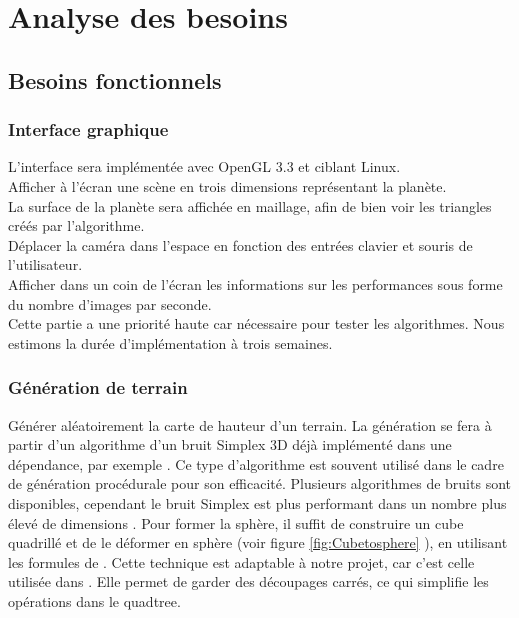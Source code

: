 \documentclass[12pt]{report}
\begin{document}
\newpage

\chapter*{Analyse des besoins}
\setcounter{chapter}{3}


\section{Besoins fonctionnels}

\subsection{Interface graphique}

L'interface sera implémentée avec OpenGL 3.3 et ciblant Linux.\\
Afficher à l'écran une scène en trois dimensions représentant la planète.\\
La surface de la planète sera affichée en maillage, afin de bien voir
les triangles créés par l'algorithme.\\
Déplacer la caméra dans l'espace en fonction des entrées clavier et
souris de l'utilisateur.\\
Afficher dans un coin de l'écran les informations sur les performances
sous forme du nombre d'images par seconde.\\

Cette partie a une priorité haute car nécessaire pour tester les
algorithmes. Nous estimons la durée d'implémentation à trois semaines.\\


\subsection{Génération de terrain}


Générer aléatoirement la carte de hauteur d'un terrain.  La génération
se fera à partir d'un algorithme d'un bruit Simplex 3D déjà implémenté
dans une dépendance, par exemple \cite{libnoise}. Ce type d'algorithme
est souvent utilisé dans le cadre de génération procédurale pour son
efficacité. Plusieurs algorithmes de bruits sont disponibles, cependant
le bruit Simplex est plus performant dans un nombre plus élevé de
dimensions \cite{Simplexnoise}.  Pour former la sphère, il suffit de
construire un cube quadrillé et de le déformer en sphère (voir figure
\ref{fig:Cubetosphere} ), en utilisant les formules de
\cite{Cube2Sphere}. Cette technique est adaptable à notre projet, car
c'est celle utilisée dans \cite{WorldGenerator}. Elle permet de garder
des découpages carrés, ce qui simplifie les opérations dans le
quadtree.\\
\end{document}
